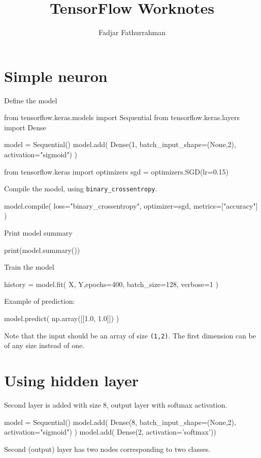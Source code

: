 \documentclass[a4paper,12pt]{article} %
\newcommand{\txtinline}[1]{\texttt{#1}}
\begin{document}
\title{TensorFlow Worknotes}
\author{Fadjar Fathurrahman}
\date{}
\maketitle


\section{Simple neuron}

Define the model
\begin{pythoncode}
from tensorflow.keras.models import Sequential
from tensorflow.keras.layers import Dense

model = Sequential()
model.add( Dense(1, batch_input_shape=(None,2), activation="sigmoid") )
\end{pythoncode}

\begin{pythoncode}
from tensorflow.keras import optimizers
sgd = optimizers.SGD(lr=0.15)
\end{pythoncode}

Compile the model, using \txtinline{binary_crossentropy}.

\begin{pythoncode}
model.compile(
    loss="binary_crossentropy",
    optimizer=sgd,
    metrics=["accuracy"]
)
\end{pythoncode}

Print model summary
\begin{pythoncode}
print(model.summary())
\end{pythoncode}

Train the model
\begin{pythoncode}
history = model.fit(
    X, Y,epochs=400,
    batch_size=128,
    verbose=1
)
\end{pythoncode}

Example of prediction:
\begin{pythoncode}
model.predict( np.array([[1.0, 1.0]]) )
\end{pythoncode}

Note that the input should be an array of size \txtinline{(1,2)}.
The first dimension can be of any size instead of one.

\section{Using hidden layer}

Second layer is added with size 8, output layer with softmax activation.
\begin{pythoncode}
model = Sequential()
model.add( Dense(8, batch_input_shape=(None,2), activation="sigmoid") )
model.add( Dense(2, activation='softmax'))
\end{pythoncode}
Second (output) layer has two nodes corresponding to two classes.
\end{document}
